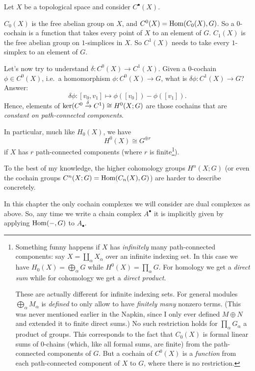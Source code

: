 \begin{example}
	[$C^0(X; G)$, $C^1(X; G)$, and $H^0(X;G)$]
	Let $X$ be a topological space and consider $C^\bullet(X)$.
	\begin{itemize}
		\ii $C_0(X)$ is the free abelian group on $X$,
		and $C^0(X) = \operatorname{Hom}(C_0(X), G)$.
		So a $0$-cochain is a function that
		takes every point of $X$ to an element of $G$.
		\ii $C_1(X)$ is the free abelian group on $1$-simplices in $X$.
		So $C^1(X)$ needs to take every $1$-simplex to an element of $G$.
	\end{itemize}
	Let's now try to understand $\delta \colon C^0(X) \to C^1(X)$.
	Given a $0$-cochain $\phi \in C^0(X)$,
	i.e.\ a homomorphism $\phi \colon C^0(X) \to G$,
	what is $\delta\phi \colon C^1(X) \to G$?
	Answer:
	\[ \delta\phi \colon [v_0, v_1] \mapsto \phi([v_0]) - \phi([v_1]). \]
	Hence, elements of
	$\ker(C^0 \xrightarrow{\delta} C^1) \cong H^0(X;G)$
	are those cochains
	that are \emph{constant on path-connected components}.
\end{example}
In particular, much like $H_0(X)$, we have \[ H^0(X) \cong G^{\oplus r} \]
if $X$ has $r$ path-connected components (where $r$ is finite\footnote{%
	Something funny happens if $X$ has \emph{infinitely} many path-connected components:
	say $X = \coprod_\alpha X_\alpha$ over an infinite indexing set.
	In this case we have
	$H_0(X) = \bigoplus_\alpha G$ while $H^0(X) = \prod_\alpha G$.
	For homology we get a \emph{direct sum} while
	for cohomology we get a \emph{direct product}.

	These are actually different for infinite indexing sets.
	For general modules $\bigoplus_\alpha M_\alpha$ is \emph{defined} to only allow
	to have \emph{finitely many} nonzero terms.
	(This was never mentioned earlier in the Napkin,
	since I only ever defined $M \oplus N$ and extended it to finite direct sums.)
	No such restriction holds for $\prod_\alpha G_\alpha$ a product of groups.
	This corresponds to the fact that $C_0(X)$ is formal linear sums of $0$-chains
	(which, like all formal sums, are finite)
	from the path-connected components of $G$.
	But a cochain of $C^0(X)$ is a \emph{function}
	from each path-connected component of $X$ to $G$,
	where there is no restriction.
}).

To the best of my knowledge, the higher cohomology groups $H^n(X; G)$
(or even the cochain groups $C^n(X; G) = \operatorname{Hom}(C_n(X), G)$) are harder to describe concretely.

\begin{abuse}
	In this chapter the only cochain complexes
	we will consider are dual complexes as above.
	So, any time we write a chain complex $A^\bullet$ it is implicitly given
	by applying $\operatorname{Hom}(-,G)$ to $A_\bullet$.
\end{abuse}

